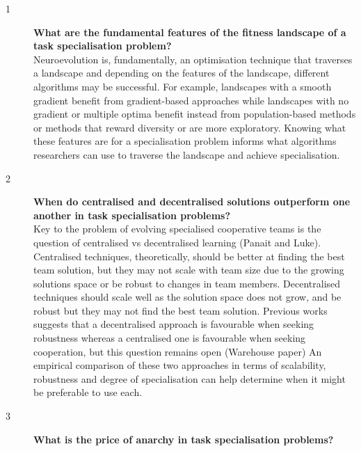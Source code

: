 \documentclass[12pt]{article}
\begin{document}
\begin{description}
\item[1] \textbf{What are the fundamental features of the fitness landscape of a task specialisation problem?}\\

Neuroevolution is, fundamentally, an optimisation technique that traverses a landscape and depending on the features of the landscape, different algorithms may be successful.
For example, landscapes with a smooth gradient benefit from gradient-based approaches while landscapes with no gradient or multiple optima benefit instead from population-based methods or methods that reward diversity or are more exploratory.
Knowing what these features are for a specialisation problem informs what algorithms researchers can use to traverse the landscape and achieve specialisation.

\item[2] \textbf{When do centralised and decentralised solutions outperform one another in task specialisation problems?}\\

Key to the problem of evolving specialised cooperative teams is the question of centralised vs decentralised learning (Panait and Luke).
Centralised techniques, theoretically, should be better at finding the best team solution, but they may not scale with team size due to the growing solutions space or be robust to changes in team members.
Decentralised techniques should scale well as the solution space does not grow, and be robust but they may not find the best team solution.
Previous works suggests that a decentralised approach is favourable when seeking robustness whereas a centralised one is favourable when seeking cooperation, but this question remains open (Warehouse paper)
An empirical comparison of these two approaches in terms of scalability, robustness and degree of specialisation can help determine when it might be preferable to use each.

\item[3] \textbf{What is the price of anarchy in task specialisation problems?}\\


\end{description}
\end{document}
